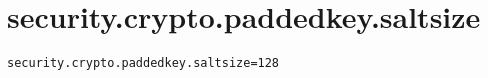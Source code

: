 \section{security.crypto.paddedkey.saltsize}
\label{configuration:SecurityCryptoPaddedkeySaltsize}
\AvailableInJavaOnly{\TODO}
\begin{lstlisting}[style=Props,caption={Usage example for \textit{security.crypto.paddedkey.saltsize}}]
security.crypto.paddedkey.saltsize=128
\end{lstlisting}